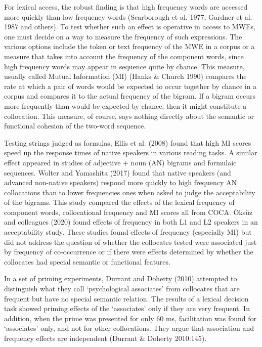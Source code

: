 \documentclass[12pt]{article}
\newenvironment{styleStandard}{\setlength\leftskip{0cm}\setlength\rightskip{0cm plus 1fil}\setlength\parindent{0cm}\setlength\parfillskip{0pt plus 1fil}\setlength\parskip{0in plus 1pt}\writerlistparindent\writerlistleftskip\leavevmode\normalfont\normalsize\writerlistlabel\ignorespaces}{\unskip\vspace{0.111in plus 0.0111in}\par}
\newcommand\writerlistleftskip{}
\newcommand\writerlistparindent{}
\newcommand\writerlistlabel{}
\begin{document}
\begin{styleStandard}
For lexical access, the robust finding is that high frequency words are accessed more quickly than low frequency words (Scarborough et al. 1977, Gardner et al. 1987 and others). To test whether such an effect is operative in access to MWEs, one must decide on a way to measure the frequency of such expressions. The various options include the token or text frequency of the MWE in a corpus or a measure that takes into account the frequency of the component words, since high frequency words may appear in sequence quite by chance. This measure, usually called Mutual Information (MI) (Hanks \& Church 1990) compares the rate at which a pair of words would be expected to occur together by chance in a corpus and compares it to the actual frequency of the bigram. If a bigram occurs more frequently than would be expected by chance, then it might constitute a collocation. This measure, of course, says nothing directly about the semantic or functional cohesion of the two-word sequence. \ 
\end{styleStandard}

\begin{styleStandard}
Testing strings judged as formulas, Ellis et al. (2008) found that high MI scores speed up the response times of native speakers in various reading tasks. A similar effect appeared in studies of adjective + noun (AN) bigrams and formulaic sequences. Wolter and Yamashita (2017) found that native speakers (and advanced non-native speakers) respond more quickly to high frequency AN collocations than to lower frequencies ones when asked to judge the acceptability of the bigrams. This study compared the effects of the lexical frequency of component words, collocational frequency and MI scores all from COCA. Öksüz and colleagues (2020) found effects of frequency in both L1 and L2 speakers in an acceptability study. These studies found effects of frequency (especially MI) but did not address the question of whether the collocates tested were associated just by frequency of co-occurrence or if there were effects determined by whether the collocates had special semantic or functional features.
\end{styleStandard}

\begin{styleStandard}
In a set of priming experiments, Durrant and Doherty (2010) attempted to distinguish what they call ‘psychological associates’ from collocates that are frequent but have no special semantic relation. The results of a lexical decision task showed priming effects of the ‘associates’ only if they are very frequent. In addition, when the prime was presented for only 60 ms, facilitation was found for ‘associates’ only, and not for other collocations. They argue that association and frequency effects are independent (Durrant \& Doherty 2010:145). 
\end{styleStandard}
\end{document}
